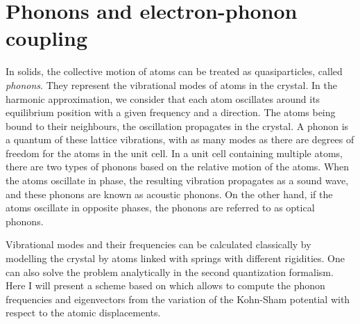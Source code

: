 %
%
\section{Phonons and electron-phonon coupling}
In solids, the collective motion of atoms can be treated as quasiparticles, called \textit{phonons}. They represent the vibrational modes of atoms in the crystal. In the harmonic approximation, we consider that each atom oscillates around its equilibrium position with a given frequency and a direction. 
The atoms being bound to their neighbours, the oscillation propagates in the crystal. A phonon is a quantum of these lattice vibrations, with as many modes as there are degrees of freedom for the atoms in the unit cell. 
In a unit cell containing multiple atoms, there are two types of phonons based on the relative motion of the atoms. When the atoms oscillate in phase, the resulting vibration propagates as a sound wave, and these phonons are known as acoustic phonons. On the other hand, if the atoms oscillate in opposite phases, the phonons are referred to as optical phonons.

Vibrational modes and their frequencies can be calculated classically by modelling the crystal by atoms linked with springs with different rigidities. One can also solve the problem analytically in the second quantization formalism. Here I will present a scheme based on  which allows to compute the phonon frequencies and eigenvectors from the variation of the Kohn-Sham potential with respect to the atomic displacements. 

